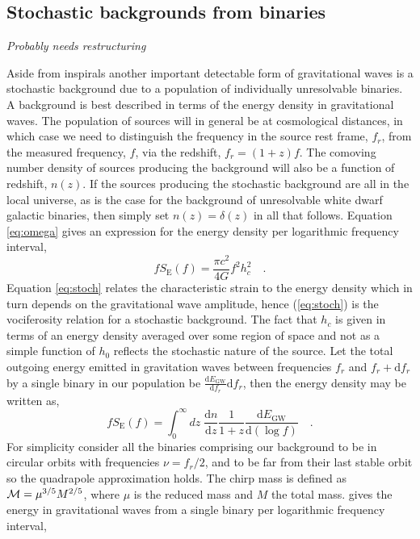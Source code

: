 \subsection{Stochastic backgrounds from binaries}

\emph{Probably needs restructuring}

Aside from inspirals another important detectable form of gravitational waves is a stochastic background due to a population of individually unresolvable binaries. A background is best described in terms of the energy density in gravitational waves. The population of sources will in general be at cosmological distances, in which case we need to distinguish the frequency in the source rest frame, $f_{r}$, from the measured frequency, $f$, via the redshift, $f_{r}=(1+z)f$. The comoving number density of sources producing the background will also be a function of redshift, $n(z)$. If the sources producing the stochastic background are all in the local universe, as is the case for the background of unresolvable white dwarf galactic binaries, then simply set $n(z)=\delta (z)$ in all that follows. Equation \ref{eq:omega} gives an expression for the energy density per logarithmic frequency interval,
\begin{equation}\label{eq:stoch} fS_{\textrm{E}}(f)=\frac{\pi c^{2}}{4G}f^{2}h_{c}^{2} \quad . \end{equation}
Equation \ref{eq:stoch} relates the characteristic strain to the energy density which in turn depends on the gravitational wave amplitude, hence (\ref{eq:stoch}) is the vociferosity relation for a stochastic background. The fact that $h_{c}$ is given in terms of an energy density averaged over some region of space and not as a simple function of $h_{0}$ reflects the stochastic nature of the source. Let the total outgoing energy emitted in gravitation waves between frequencies $f_{r}$ and $f_{r}+\textrm{d}f_{r}$ by a single binary in our population be $\frac{\textrm{d}E_{\textrm{GW}}}{\textrm{d}f_{r}}\textrm{d}f_{r}$, then the energy density may be written as,
\begin{equation}\label{eq:Phinney} fS_{\textrm{E}}(f)=\int_{0}^{\infty}dz\; \frac{\textrm{d}n}{\textrm{d}z}\frac{1}{1+z}\frac{\textrm{d}E_{\textrm{GW}}}{\textrm{d}\left(\log f\right)} \quad . \end{equation}
For simplicity consider all the binaries comprising our background to be in circular orbits with frequencies $\nu=f_{r}/2$, and to be far from their last stable orbit so the quadrapole approximation holds. The chirp mass is defined as ${\cal{M}}=\mu^{3/5}M^{2/5}$, where $\mu$ is the reduced mass and $M$ the total mass. \cite{Thorne} gives the energy in gravitational waves from a single binary per logarithmic frequency interval,
